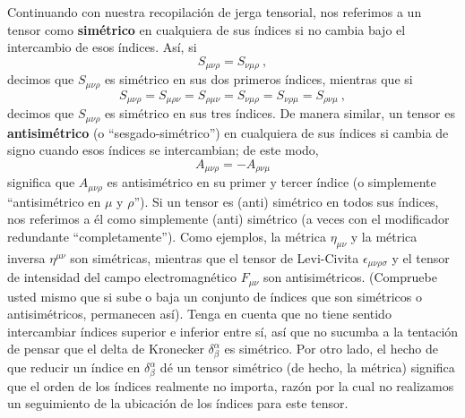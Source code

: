 \documentclass[11pt,b5paper,openany,twoside]{book}
\newcommand{\mn}{{\mu\nu}}
\begin{document}
Continuando con nuestra recopilación de jerga tensorial, nos referimos a un tensor como {\bf simétrico} en cualquiera de sus índices si no cambia bajo el intercambio de esos índices.
Así, si
\begin{equation}
S_{\mu\nu\rho} = S_{\nu\mu\rho}\ ,\label{1.64}
\end{equation}
decimos que $S_{\mu\nu\rho}$ es simétrico en sus dos primeros índices, mientras que si
\begin{equation}
S_{\mu\nu\rho} = S_{\mu\rho\nu} = S_{\rho\mu\nu} = S_{\nu\mu\rho}
= S_{\nu\rho\mu} = S_{\rho\nu\mu} \ ,\label{1.65}
\end{equation}
decimos que $S_{\mu\nu\rho}$ es simétrico en sus tres índices.
De manera similar, un tensor es {\bf antisimétrico} (o ``sesgado-simétrico'') en cualquiera de sus índices si cambia de signo cuando esos índices se intercambian; de este modo,
\begin{equation}
A_{\mu\nu\rho} = -A_{\rho\nu\mu}\label{1.66}
\end{equation}
significa que $A_{\mu\nu\rho}$ es antisimétrico en su primer y tercer índice (o simplemente ``antisimétrico en $\mu$ y $\rho$'').
Si un tensor es (anti) simétrico en todos sus índices, nos referimos a él como simplemente (anti) simétrico (a veces con el modificador redundante ``completamente'').
Como ejemplos, la métrica $\eta_{\mn}$ y la métrica inversa $\eta^{\mu\nu}$ son simétricas, mientras que el tensor de Levi-Civita $\epsilon_{\mu\nu\rho\sigma}$ y el tensor de intensidad del campo electromagnético $F_{\mu\nu}$ son antisimétricos.
(Compruebe usted mismo que si sube o baja un conjunto de índices que son simétricos o antisimétricos, permanecen así).
Tenga en cuenta que no tiene sentido intercambiar índices superior e inferior entre sí, así que no sucumba a la tentación de pensar que el delta de Kronecker $\delta^\alpha_\beta$ es simétrico.
Por otro lado, el hecho de que reducir un índice en $\delta^\alpha_\beta$ dé un tensor simétrico (de hecho, la métrica) significa que el orden de los índices realmente no importa, razón por la cual no realizamos un seguimiento de la ubicación de los índices para este tensor.
\end{document}
